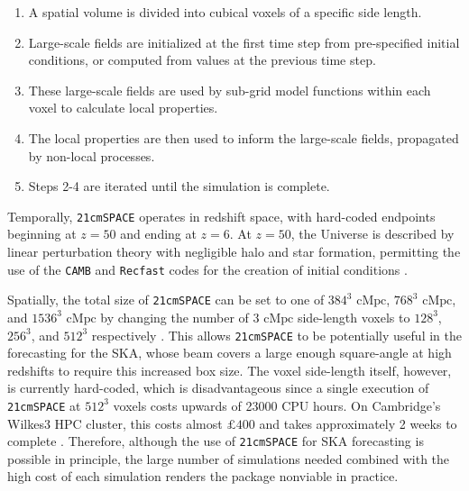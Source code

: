 \documentclass[floats,floatfix,showpacs,amssymb,prd,superscriptaddress,nofootinbib]{revtex4-2} %
\newcommand{\code}{\texttt}
\begin{document}
\begin{enumerate}
    \item A spatial volume is divided into cubical voxels of a specific side length.

    \item Large-scale fields are initialized at the first time step from pre-specified initial conditions, or computed from values at the previous time step.

    \item These large-scale fields are used by sub-grid model functions within each voxel to calculate local properties.

    \item The local properties are then used to inform the large-scale fields, propagated by non-local processes.

    \item Steps 2-4 are iterated until the simulation is complete.
\end{enumerate}


Temporally, \code{21cmSPACE} operates in redshift space, with hard-coded endpoints beginning at $z = 50$ and ending at $z = 6$. At $z = 50$, the Universe is described by linear perturbation theory with negligible halo and star formation, permitting the use of the \code{CAMB} and \code{Recfast} codes for the creation of initial conditions \cite{gessey-jones_2024}.

Spatially, the total size of \code{21cmSPACE} can be set to one of $384^3 \text{ cMpc}$, $768^3 \text{ cMpc}$, and $1536^3 \text{ cMpc}$ by changing the number of $3 \text{ cMpc}$ side-length voxels to $128^3$, $256^3$, and $512^3$ respectively \cite{dhandha_2022}. This allows \code{21cmSPACE} to be potentially useful in the forecasting for the SKA, whose beam covers a large enough square-angle at high redshifts to require this increased box size. The voxel side-length itself, however, is currently hard-coded, which is disadvantageous since a single execution of \code{21cmSPACE} at $512^3$ voxels costs upwards of 23000 CPU hours. On Cambridge's Wilkes3 HPC cluster, this costs almost $\pounds 400$ and takes approximately 2 weeks to complete \cite{dhandha_2022}. Therefore, although the use of \code{21cmSPACE} for SKA forecasting is possible in principle, the large number of simulations needed combined with the high cost of each simulation renders the package nonviable in practice.
\end{document}
